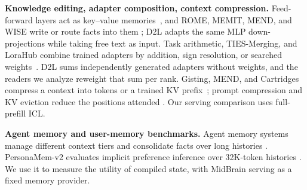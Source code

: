 \documentclass{article}
\begin{document}
\textbf{Knowledge editing, adapter composition, context compression.} Feed-forward
layers act as key--value memories~\citep{geva2021transformer}, and ROME, MEMIT,
MEND, and WISE write or route facts into them
\citep{meng2022locating,meng2023massediting,mitchell2022fast,wang2024wise}; D2L
adapts the same MLP down-projections while taking free text as input. Task arithmetic,
TIES-Merging, and LoraHub combine trained adapters by addition, sign resolution, or
searched weights~\citep{ilharco2023editing,yadav2023tiesmerging,huang2024lorahub}.
D2L sums independently generated adapters without weights, and the readers we
analyze reweight that sum per rank. Gisting, MEND, and Cartridges compress a context
into tokens or a trained KV prefix~\citep{mu2023learning,li2024mend,eyuboglu2026cartridges};
prompt compression and KV eviction reduce the positions attended
\citep{jiang2023llmlingua,pan2024llmlingua2,zhang2023h2o,li2024snapkv}.
Our serving comparison uses full-prefill ICL.

\textbf{Agent memory and user-memory benchmarks.} Agent memory systems manage
different context tiers and consolidate facts over long histories
\citep{packer2023memgpt,chhikara2025mem0,xu2025amem,maharana2024evaluating,wu2025longmemeval}.
PersonaMem-v2 evaluates implicit preference inference over 32K-token histories
\citep{jiang2025personamemv2}. We use it to measure the utility of compiled state,
with MidBrain serving as a fixed memory provider.










\clearpage
\appendix



\clearpage
\end{document}
